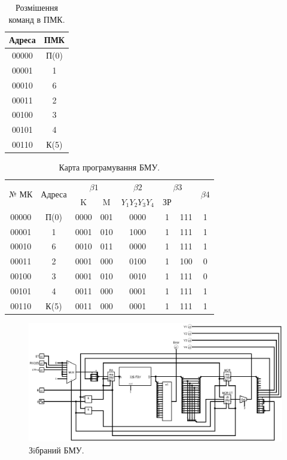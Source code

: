 \documentclass[a4paper, 10pt]{article}
\begin{document}
\begin{table}[H]
\centering
\begin{tabular}{|c|c|}
\hline
Адреса & ПМК \\
\hline
00000 & П(0) \\
00001 & 1 \\
00010 & 6 \\
00011 & 2 \\
00100 & 3 \\
00101 & 4 \\
00110 & К(5) \\
\hline
\end{tabular}
\caption{Розмішення команд в ПМК.}
\end{table}

\begin{table}[H]
\centering
\begin{tabular}{|c|c|c|c|c|c|c|c|}
\hline
\multirow{2}{*}{№ МК} &
\multirow{2}{*}{Адреса} &
\multicolumn{2}{|c|}{$\beta1$} &
$\beta2$ & 
\multicolumn{2}{|c|}{$\beta3$} &
\multirow{2}{*}{$\beta4$} \\
\cline{3-7}
      &      &  K   &  M  & $Y_1 Y_2 Y_3 Y_4$ & ЗР &     & \\
\hline
00000 & П(0) & 0000 & 001 & 0000           & 1  & 111 & 1 \\
00001 & 1    & 0001 & 010 & 1000           & 1  & 111 & 1 \\
00010 & 6    & 0010 & 011 & 0000           & 1  & 111 & 1 \\
00011 & 2    & 0001 & 000 & 0100           & 1  & 100 & 0 \\
00100 & 3    & 0001 & 010 & 0010           & 1  & 111 & 0 \\
00101 & 4    & 0011 & 000 & 0001           & 1  & 111 & 1 \\
00110 & К(5) & 0011 & 000 & 0001           & 1  & 111 & 1 \\
\hline
\end{tabular}
\caption{Карта програмування БМУ.}
\end{table}

\begin{figure}[H]
\begin{center}
\includegraphics[scale=0.6, angle=90]{mpcu_circ.png}
\caption{Зiбраний БМУ.}
\end{center}
\end{figure}
\end{document}
